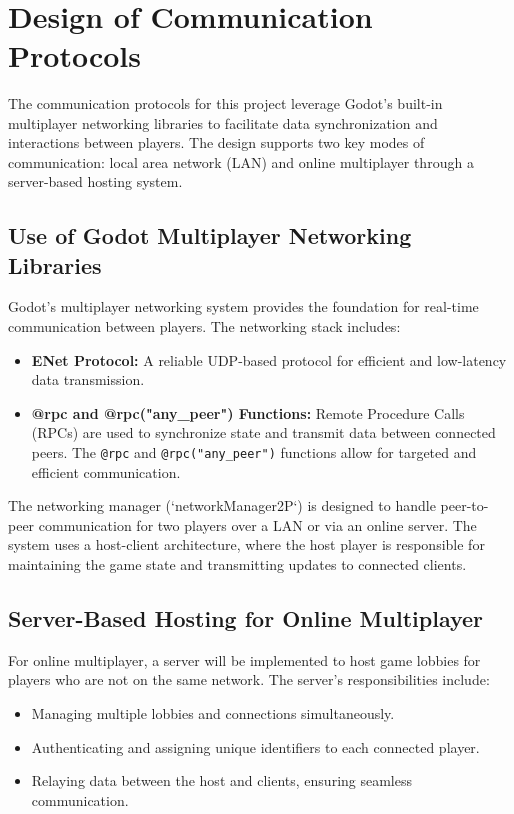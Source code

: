 \documentclass[12pt, titlepage]{article}
\begin{document}
~\newpage
\section{Design of Communication Protocols}

The communication protocols for this project leverage Godot's built-in multiplayer networking libraries to facilitate data synchronization and interactions between players. The design supports two key modes of communication: local area network (LAN) and online multiplayer through a server-based hosting system.

\subsection{Use of Godot Multiplayer Networking Libraries}

Godot's multiplayer networking system provides the foundation for real-time communication between players. The networking stack includes:
\begin{itemize}
    \item \textbf{ENet Protocol:} A reliable UDP-based protocol for efficient and low-latency data transmission.
    \item \textbf{@rpc and @rpc("any\_peer") Functions:} Remote Procedure Calls (RPCs) are used to synchronize state and transmit data between connected peers. The \texttt{@rpc} and \texttt{@rpc("any\_peer")} functions allow for targeted and efficient communication.
\end{itemize}

The networking manager (`networkManager2P`) is designed to handle peer-to-peer communication for two players over a LAN or via an online server. The system uses a host-client architecture, where the host player is responsible for maintaining the game state and transmitting updates to connected clients.

\subsection{Server-Based Hosting for Online Multiplayer}

For online multiplayer, a server will be implemented to host game lobbies for players who are not on the same network. The server's responsibilities include:
\begin{itemize}
    \item Managing multiple lobbies and connections simultaneously.
    \item Authenticating and assigning unique identifiers to each connected player.
    \item Relaying data between the host and clients, ensuring seamless communication.
\end{itemize}
\end{document}
